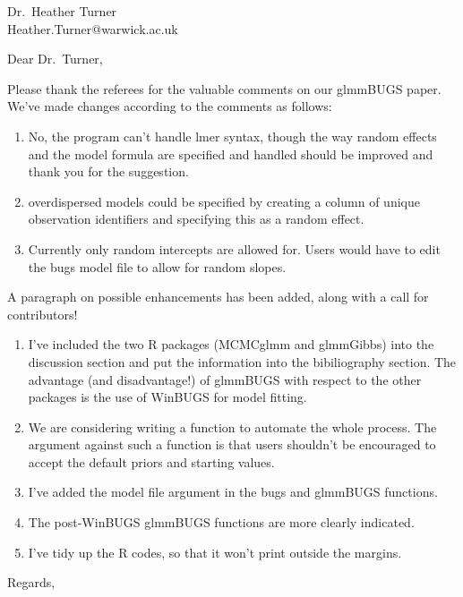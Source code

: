 \documentclass[12pt]{letter}
\begin{document}
\begin{letter}{
Dr.\ Heather Turner\\
Heather.Turner@warwick.ac.uk
}

\opening{Dear Dr.\ Turner,} 



Please thank the referees for the valuable comments on our glmmBUGS paper. We've made changes according to the comments as follows:


\begin{enumerate}
	\item No, the program can't handle lmer syntax, though the way random effects and the model formula are specified and handled should be improved and thank you for the suggestion. 
	\item overdispersed models could be specified by creating a column of unique observation identifiers and specifying this as a random effect.  
	\item Currently only random intercepts are allowed for.  Users would have to edit the bugs model file to allow for random slopes. 
\end{enumerate}
A paragraph on possible enhancements has been added, along with a call for contributors!


\begin{enumerate}
\item I've included the two R packages (MCMCglmm and glmmGibbs) into the discussion section and put the information into the bibiliography	 section.  The advantage (and disadvantage!) of glmmBUGS with respect to the other packages is the use of WinBUGS for model fitting.

\item We are considering writing a function to automate the whole process. The argument against such a function is that users shouldn't be encouraged to accept the default priors and starting values. 

\item I've added the model file argument in the bugs and glmmBUGS functions.

\item The post-WinBUGS glmmBUGS functions are more clearly indicated.

\item  I've tidy up the R codes, so that it won't print outside the margins.
\end{enumerate}


\closing{Regards,}


\end{letter}
\end{document}
